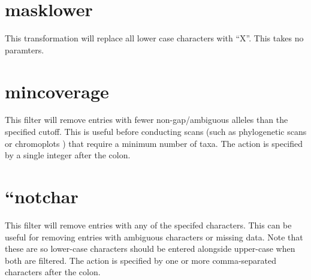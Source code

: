 \documentclass[letterpaper,11pt,english]{sphinxmanual}
\begin{document}
\section{masklower}
\label{\detokenize{mvf_filter_modules:masklower}}
This transformation will replace all lower case characters with “X”.
This takes no paramters.

%
\begin{sphinxVerbatim}[commandchars=\\\{\}]
  
 
 
\end{sphinxVerbatim}


\section{mincoverage}
\label{\detokenize{mvf_filter_modules:mincoverage}}
This filter will remove entries with fewer non-gap/ambiguous alleles
than the specified cutoff. This is useful before conducting scans
(such as phylogenetic scans or chromoplots ) that require a minimum
number of taxa.  The action is specified by a single integer after
the colon.

%
\begin{sphinxVerbatim}[commandchars=\\\{\}]
  
 
 
\end{sphinxVerbatim}


\section{“notchar}
\label{\detokenize{mvf_filter_modules:notchar}}
This filter will remove entries with any of the specifed characters.
This can be useful for removing entries with ambiguous characters
or missing data.  Note that these are  so lower-case
characters should be entered alongside upper-case when both are
filtered.  The action is specified by one or more comma-separated
characters after the colon.
\end{document}
